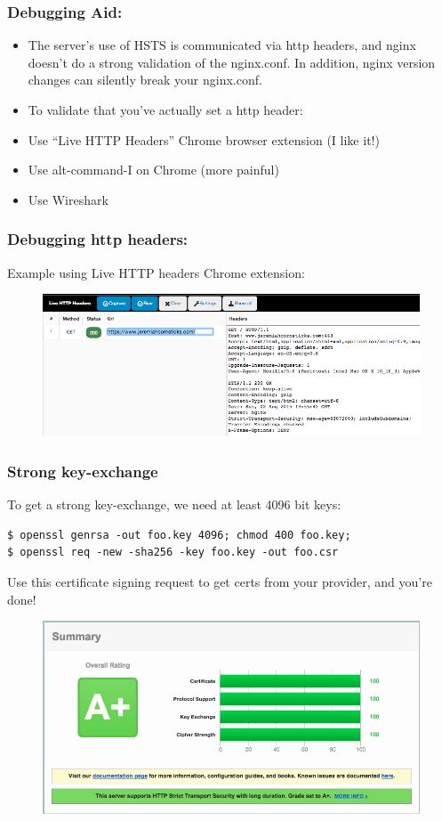 \documentclass[9pt]{beamer}
\begin{document}
\begin{frame}[fragile]
\frametitle{Debugging Aid:}
\begin{itemize}
\item The server's use of HSTS is communicated via http headers, and nginx doesn't do a strong validation of the nginx.conf. In addition, nginx version changes can silently break your nginx.conf.
\pause
\item To validate that you've actually set a http header:
\pause
\item Use ``Live HTTP Headers'' Chrome browser extension (I like it!)
\pause 
\item Use alt-command-I on Chrome (more painful)
\pause 
\item Use Wireshark
\end{itemize}
\end{frame}

\begin{frame}[fragile]
\frametitle{Debugging http headers:}
Example using Live HTTP headers Chrome extension:
\begin{figure}
\includegraphics[scale=0.35]{./figures/xframedeny.png}
\end{figure}
\end{frame}


\begin{frame}[fragile]
\frametitle{Strong key-exchange}
To get a strong key-exchange, we need at least 4096 bit keys:
\pause
\begin{verbatim}
$ openssl genrsa -out foo.key 4096; chmod 400 foo.key;
$ openssl req -new -sha256 -key foo.key -out foo.csr
\end{verbatim}
\pause
Use this certificate signing request to get certs from your provider, and you're done!
\begin{figure}
\includegraphics[scale=0.25]{figures/App.png}
\end{figure}
\end{frame}
\end{document}
